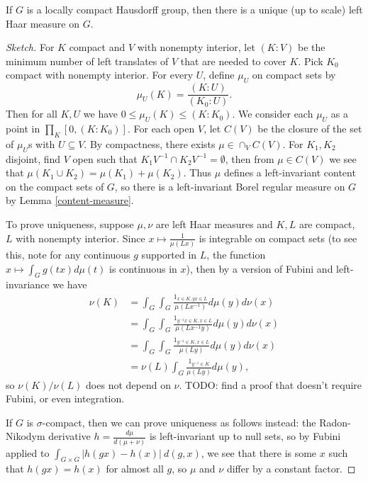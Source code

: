 \documentclass[letterpaper,11pt]{report}
\begin{document}
\begin{thm} If $G$ is a locally compact Hausdorff group, then there is a unique (up to scale) left Haar measure on $G$.
\end{thm}
\begin{proof}[Sketch] For $K$ compact and $V$ with nonempty interior, let $(K:V)$ be the minimum number of left translates of $V$ that are needed to cover $K$. Pick $K_0$ compact with nonempty interior. For every $U$, define $\mu_U$ on compact sets by
\[
\mu_U(K) = \frac{(K:U)}{(K_0:U)}.
\]
Then for all $K,U$ we have $0 \le \mu_U(K) \le (K:K_0)$. We consider each $\mu_U$ as a point in $\prod_K [0,(K:K_0)]$. For each open $V$, let $C(V)$ be the closure of the set of $\mu_U$s with $U \subseteq V$. By compactness, there exists $\mu \in \cap_V C(V)$. For $K_1, K_2$ disjoint, find $V$ open such that $K_1V^{-1} \cap K_2V^{-1} = \emptyset$, then from $\mu \in C(V)$ we see that $\mu(K_1 \cup K_2) = \mu(K_1) + \mu(K_2)$. Thus $\mu$ defines a left-invariant content on the compact sets of $G$, so there is a left-invariant Borel regular measure on $G$ by Lemma \ref{content-measure}.

To prove uniqueness, suppose $\mu, \nu$ are left Haar measures and $K,L$ are compact, $L$ with nonempty interior. Since $x \mapsto \frac{1}{\mu(Lx)}$ is integrable on compact sets (to see this, note for any continuous $g$ supported in $L$, the function $x \mapsto \int_G g(tx) d\mu(t)$ is continuous in $x$), then by a version of Fubini and left-invariance we have
\begin{align*}
\nu(K) &= \int_G \int_G \frac{1_{x\in K, yx \in L}}{\mu(Lx^{-1})} d\mu(y) d\nu(x)\\
&= \int_G \int_G \frac{1_{y^{-1}x\in K, x \in L}}{\mu(Lx^{-1}y)} d\mu(y) d\nu(x)\\
&= \int_G \int_G \frac{1_{y^{-1} \in K, x \in L}}{\mu(Ly)} d\mu(y) d\nu(x)\\
&= \nu(L) \int_G \frac{1_{y^{-1} \in K}}{\mu(Ly)} d\mu(y),
\end{align*}
so $\nu(K)/\nu(L)$ does not depend on $\nu$. TODO: find a proof that doesn't require Fubini, or even integration.

If $G$ is $\sigma$-compact, then we can prove uniqueness as follows instead: the Radon-Nikodym derivative $h = \frac{d\mu}{d(\mu+\nu)}$ is left-invariant up to null sets, so by Fubini applied to $\int_{G\times G} |h(gx)-h(x)|\ d(g,x)$, we see that there is some $x$ such that $h(gx) = h(x)$ for almost all $g$, so $\mu$ and $\nu$ differ by a constant factor.
\end{proof}
\end{document}
